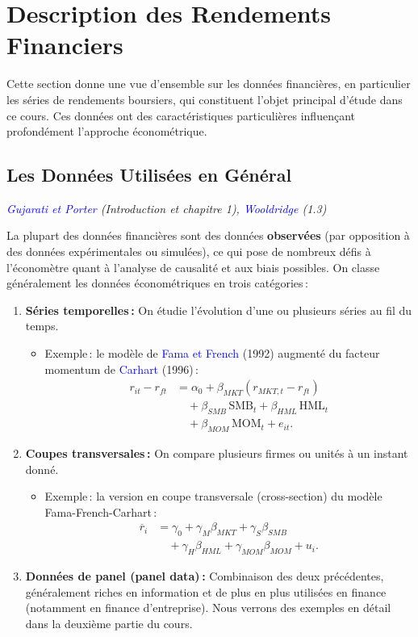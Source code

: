 \documentclass[14pt]{extarticle} %
\newcommand{\livre}[1]{\textcolor{blue}{#1}}
\begin{document}
\section{Description des Rendements Financiers}

Cette section donne une vue d’ensemble sur les données financières, en particulier les séries de rendements boursiers, qui constituent l’objet principal d’étude dans ce cours. Ces données ont des caractéristiques particulières influençant profondément l’approche économétrique.

\subsection{Les Données Utilisées en Général}

\textit{\livre{Gujarati et Porter} (Introduction et chapitre 1), \livre{Wooldridge} (1.3)}

La plupart des données financières sont des données \textbf{observées} (par opposition à des données expérimentales ou simulées), ce qui pose de nombreux défis à l’économètre quant à l’analyse de causalité et aux biais possibles. On classe généralement les données économétriques en trois catégories :

\begin{enumerate}
    \item \textbf{Séries temporelles :} On étudie l’évolution d’une ou plusieurs séries au fil du temps.  
    \begin{itemize}
        \item Exemple : le modèle de \livre{Fama et French} (1992) augmenté du facteur momentum de \livre{Carhart} (1996) :
        \begin{align*}
            r_{it} - r_{ft} &= \alpha_0 + \beta_{MKT}(r_{MKT,t} - r_{ft}) \\
            &\quad + \beta_{SMB} \,\text{SMB}_t + \beta_{HML} \,\text{HML}_t \\
            &\quad + \beta_{MOM} \,\text{MOM}_t + e_{it}.
        \end{align*}
    \end{itemize}
    \item \textbf{Coupes transversales :} On compare plusieurs firmes ou unités à un instant donné.  
    \begin{itemize}
        \item Exemple : la version en coupe transversale (cross-section) du modèle Fama-French-Carhart :
        \begin{align*}
            \overline{r}_i &= \gamma_0 + \gamma_M \beta_{MKT} + \gamma_S \beta_{SMB} \\
            &\quad + \gamma_H \beta_{HML} + \gamma_{MOM} \beta_{MOM} + u_i.
        \end{align*}
    \end{itemize}
    \item \textbf{Données de panel (panel data) :} Combinaison des deux précédentes, généralement riches en information et de plus en plus utilisées en finance (notamment en finance d’entreprise). Nous verrons des exemples en détail dans la deuxième partie du cours.
\end{enumerate}
\end{document}
